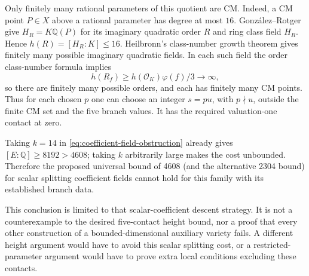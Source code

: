 Only finitely many rational parameters of this quotient are CM.
Indeed, a CM point $P\in X$ above a rational parameter has degree at
most $16$. Gonz\'alez--Rotger \cite[Theorem 5.8(1)]{GonzalezRotger2006}
give $H_R=K\mathbb Q(P)$ for its imaginary quadratic order $R$ and
ring class field $H_R$. Hence $h(R)=[H_R:K]\le16$.
Heilbronn's class-number growth theorem \cite{Heilbronn1934} gives finitely many possible
imaginary quadratic fields. In each such field the order class-number
formula implies
\[
 h(R_f)\ge h(\mathcal O_K)\varphi(f)/3\longrightarrow\infty,
\]
so there are finitely many possible orders, and each has finitely many
CM points. Thus for each chosen $p$ one can choose an integer
$s=pu$, with $p\nmid u$, outside the finite CM set and the five branch
values. It has the required valuation-one contact at zero.

Taking $k=14$ in \eqref{eq:coefficient-field-obstruction} already gives
$[E:\mathbb Q]\ge8192>4608$; taking $k$ arbitrarily large makes the
cost unbounded. Therefore the proposed universal bound of 4608
(and the alternative 2304 bound) for scalar splitting coefficient
fields cannot hold for this family with its established branch data.

This conclusion is limited to that scalar-coefficient descent strategy.
It is not a counterexample to the desired five-contact height bound,
nor a proof that every other construction of a bounded-dimensional
auxiliary variety fails. A different height argument would have to
avoid this scalar splitting cost, or a restricted-parameter argument
would have to prove extra local conditions excluding these contacts.
